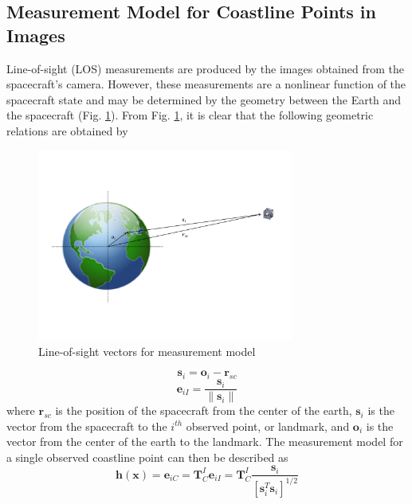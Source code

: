 \documentclass[]{aiaa-tc}%
\begin{document}

\subsection{Measurement Model for Coastline Points in Images} \label{ref:MeasModel}
Line-of-sight (LOS) measurements are produced by the images obtained from the spacecraft's camera.  However, these measurements are a nonlinear function of the spacecraft state and may be determined by the geometry between the Earth and the spacecraft (Fig. \ref{fig:LOSgeometry}).  From Fig. \ref{fig:LOSgeometry}, it is clear that the following geometric relations are obtained by
%
\begin{figure}[ht!]
\centering
\includegraphics[width=0.75\textwidth,trim=0.8in 1.5in 0.3in 1in,clip]{LOSgeometry} %
\caption{Line-of-sight vectors for measurement model}
\label{fig:LOSgeometry}
\end{figure}
%
\begin{equation} \label{eq:s}
\textbf{s}_i=\textbf{o}_i-\textbf{r}_{sc}
\end{equation}
%
\begin{equation} \label{eq:eii}
\textbf{e}_{iI}=\frac{\textbf{s}_i}{\|\textbf{s}_i\|}
\end{equation}
%
where $\textbf{r}_{sc}$ is the position of the spacecraft from the center of the earth, $\textbf{s}_i$ is the vector from the spacecraft to the $i^{th}$ observed point, or landmark, and $\textbf{o}_i$ is the vector from the center of the earth to the landmark.  The measurement model for a single observed coastline point can then be described as
%
\begin{equation} \label{eq:littleh}
\textbf{h}(\textbf{x})=\textbf{e}_{iC}=\textbf{T}_{C}^I\textbf{e}_{iI}=\textbf{T}_{C}^I\frac{\textbf{s}_i}{[\textbf{s}_i^T\textbf{s}_i]^{1/2}}
\end{equation}
\end{document}
